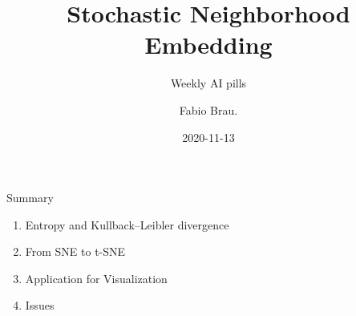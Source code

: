 \documentclass[10pt]{beamer}
\title{Stochastic Neighborhood Embedding}
\subtitle{Weekly AI pills}
\date{2020-11-13}
\author{Fabio Brau.}
\institute{SSSA, Emerging Digital Technologies, Pisa.}
\theoremstyle{definition}
\newcommand{\1}{\mathbbm{1}}
\begin{document}
{%
\maketitle
}
\begin{frame}{Summary}
  \begin{enumerate}
    \item Entropy and Kullback–Leibler divergence
    \item From SNE to t-SNE
    \item Application for Visualization
    \item Issues
  \end{enumerate}
\end{frame}
\end{document}
